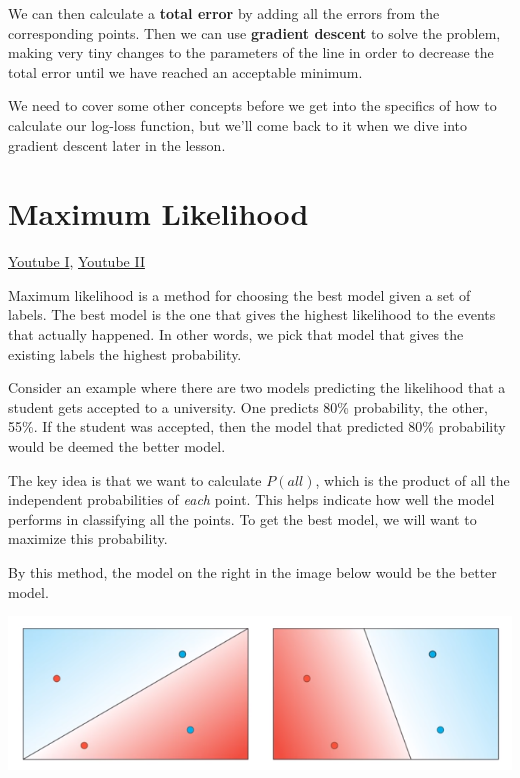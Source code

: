 We can then calculate a \textbf{total error} by adding all the errors from the corresponding points. Then we can use \textbf{gradient descent} to solve the problem, making very tiny changes to the parameters of the line in order to decrease the total error until we have reached an acceptable minimum.\newline

We need to cover some other concepts before we get into the specifics of how to calculate our log-loss function, but we'll come back to it when we dive into gradient descent later in the lesson.

\section{Maximum Likelihood}
\href{https://www.youtube.com/watch?v=1yJx-QtlvNI&t=5s&ab_channel=Udacity}{Youtube I}, \href{https://www.youtube.com/watch?v=6nUUeQ9AeUA&t=155s&ab_channel=Udacity}{Youtube II}\newline

Maximum likelihood is a method for choosing the best model given a set of labels. The best model is the one that gives the highest likelihood to the events that actually happened. In other words, we pick that model that gives the existing labels the highest probability. \newline

Consider an example where there are two models predicting the likelihood that a student gets accepted to a university. One predicts 80\% probability, the other, 55\%. If the student was accepted, then the model that predicted 80\% probability would be deemed the better model. \newline

The key idea is that we want to calculate \(P(all)\), which is the product of all the independent probabilities of \textit{each} point. This helps indicate how well the model performs in classifying all the points. To get the best model, we will want to maximize this probability. \newline

By this method, the model on the right in the image below would be the better model.

\includegraphics[width=1\linewidth]{img//intro/neural-networks-6.png}
 
